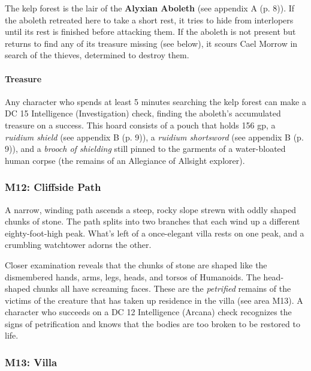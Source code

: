 \documentclass[letterpaper, 11pt, bg=full, twocolumn]{dndbook}
\begin{document}
The kelp forest is the lair of the \textbf{Alyxian Aboleth} (see appendix A (p. 8)). If the aboleth retreated here to take a short rest, it tries to hide from interlopers until its rest is finished before attacking them. If the aboleth is not present but returns to find any of its treasure missing (see below), it scours Cael Morrow in search of the thieves, determined to destroy them.

\paragraph{Treasure}

Any character who spends at least 5 minutes searching the kelp forest can make a DC 15 Intelligence (Investigation) check, finding the aboleth's accumulated treasure on a success. This hoard consists of a pouch that holds 156 gp, a \textit{ruidium shield} (see appendix B (p. 9)), a \textit{ruidium shortsword} (see appendix B (p. 9)), and a \textit{brooch of shielding} still pinned to the garments of a water-bloated human corpse (the remains of an Allegiance of Allsight explorer).


\subsubsection{M12: Cliffside Path}

\begin{DndReadAloud}
A narrow, winding path ascends a steep, rocky slope strewn with oddly shaped chunks of stone. The path splits into two branches that each wind up a different eighty-foot-high peak. What's left of a once-elegant villa rests on one peak, and a crumbling watchtower adorns the other.
\end{DndReadAloud}

Closer examination reveals that the chunks of stone are shaped like the dismembered hands, arms, legs, heads, and torsos of Humanoids. The head-shaped chunks all have screaming faces. These are the \textit{petrified} remains of the victims of the creature that has taken up residence in the villa (see area M13). A character who succeeds on a DC 12 Intelligence (Arcana) check recognizes the signs of petrification and knows that the bodies are too broken to be restored to life.

\subsubsection{M13: Villa}
\end{document}
